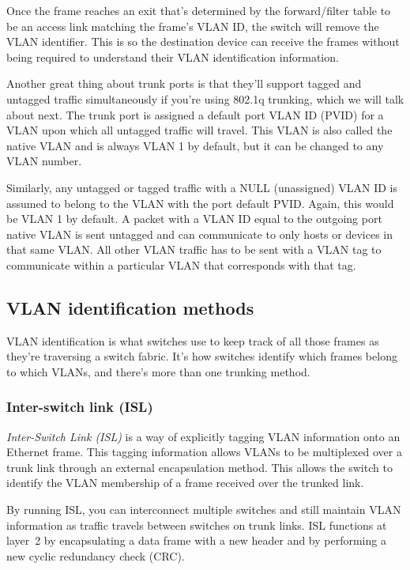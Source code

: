 \documentclass[b5paper,11pt]{memoir}
\begin{document}
Once the frame reaches an exit that's determined by the forward/filter
table to be an access link matching the frame's VLAN ID, the switch will
remove the VLAN identifier. This is so the destination device can
receive the frames without being required to understand their VLAN
identification information.

Another great thing about trunk ports is that they'll support tagged and
untagged traffic simultaneously if you're using 802.1q trunking, which
we will talk about next. The trunk port is assigned a default port VLAN
ID (PVID) for a VLAN upon which all untagged traffic will travel. This
VLAN is also called the native VLAN and is always VLAN 1 by default, but
it can be changed to any VLAN number.

Similarly, any untagged or tagged traffic with a NULL (unassigned) VLAN
ID is assumed to belong to the VLAN with the port default PVID. Again,
this would be VLAN 1 by default. A packet with a VLAN ID equal to the
outgoing port native VLAN is sent untagged and can communicate to only
hosts or devices in that same VLAN. All other VLAN traffic has to be
sent with a VLAN tag to communicate within a particular VLAN that
corresponds with that tag.



\subsection{VLAN identification methods}

VLAN identification is what switches use to keep track of all those
frames as they're traversing a switch fabric. It's how switches identify
which frames belong to which VLANs, and there's more than one trunking
method.

\subsubsection{Inter-switch link (ISL)}

\emph{Inter-Switch Link (ISL)} is a way of explicitly tagging VLAN
information onto an Ethernet frame. This tagging information allows
VLANs to be multiplexed over a trunk link through an external
encapsulation method. This allows the switch to identify the VLAN
membership of a frame received over the trunked link.

By running ISL, you can interconnect multiple switches and still
maintain VLAN information as traffic travels between switches on trunk
links. ISL functions at layer~2 by encapsulating a data frame with a new
header and by performing a new cyclic redundancy check (CRC).
\end{document}
